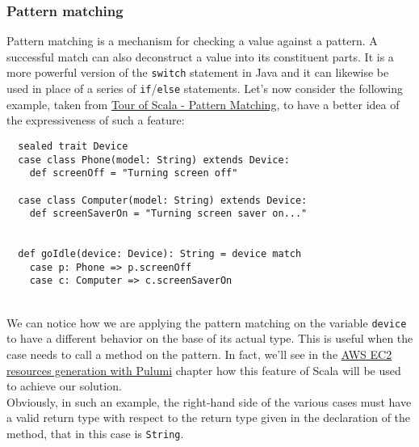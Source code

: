 \subsubsection{Pattern matching}
Pattern matching is a mechanism for checking a value against a pattern.
A successful match can also deconstruct a value into its constituent parts.
It is a more powerful version of the \texttt{switch} statement in Java and it can likewise be used in place of a series of \texttt{if}/\texttt{else} statements.
Let's now consider the following example, taken from \href{https://docs.scala-lang.org/tour/pattern-matching.html#}{Tour of Scala - Pattern Matching}, to have a better idea of the expressiveness of such a feature:
\begin{verbatim}
  sealed trait Device
  case class Phone(model: String) extends Device:
    def screenOff = "Turning screen off"

  case class Computer(model: String) extends Device:
    def screenSaverOn = "Turning screen saver on..."


  def goIdle(device: Device): String = device match
    case p: Phone => p.screenOff
    case c: Computer => c.screenSaverOn
\end{verbatim}\mbox{}\\
We can notice how we are applying the pattern matching on the variable \texttt{device} to have a different behavior on the base of its actual type.
This is useful when the case needs to call a method on the pattern.
In fact, we'll see in the \hyperref[cap:case-study]{AWS EC2 resources generation with Pulumi} chapter how this feature of Scala will be used to achieve our solution.\\
Obviously, in such an example, the right-hand side of the various cases must have a valid return type with respect to the return type given in the declaration of the method, that in this case is \texttt{String}.


